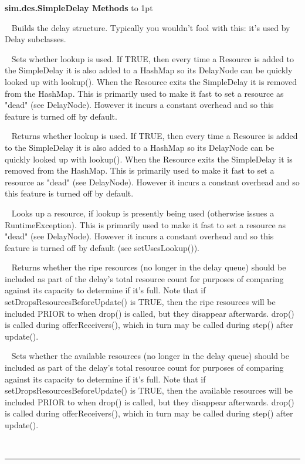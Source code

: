 \documentclass[twoside,10pt]{article}
\newcommand\class[1]{\index{Classes!{#1}}\textsf{#1}}
\newcommand*{\xfill}[1][0pt]{%
	\cleaders
		\hbox to 1pt{\hss
			\raisebox{#1}{\rule{1.2pt}{0.4pt}}%
			\hss}\hfill}
\newenvironment{methods}[1]{
\vspace{1.0em}\noindent\textsf{\textbf{#1 Methods}}\quad \xfill[0.5ex]
\vspace{-0.25em}
\begin{description}
\small}
{\end{description}\hrule\vspace{1.5em}}
\newcommand{\mthd}[1]{\item[{\sf #1}]~\newline}
\begin{document}
\begin{methods}{\class{sim.des.SimpleDelay}}
\mthd{protected void buildDelay()}
Builds the delay structure.   Typically you wouldn't fool with this: it's used by Delay subclasses.
\mthd{public void setUsesLookup(boolean val)}
Sets whether lookup is used.  If TRUE, then every time a Resource is added to the SimpleDelay it is also
    	added to a HashMap so its DelayNode can be quickly looked up with lookup().  When the Resource exits
    	the SimpleDelay it is removed from the HashMap.  This is primarily used to make it fast to
    	set a resource as "dead" (see DelayNode). However it incurs a constant overhead and so this feature
    	is turned off by default.
\mthd{public boolean getUsesLookup()}
Returns whether lookup is used.  If TRUE, then every time a Resource is added to the SimpleDelay it is also
    	added to a HashMap so its DelayNode can be quickly looked up with lookup().  When the Resource exits
    	the SimpleDelay it is removed from the HashMap.  This is primarily used to make it fast to
    	set a resource as "dead" (see DelayNode). However it incurs a constant overhead and so this feature
    	is turned off by default.
\mthd{public DelayNode lookup(Resource resource)}
 Looks up a resource, if lookup is presently being used (otherwise issues a RuntimeException).
    	This is primarily used to make it fast to
    	set a resource as "dead" (see DelayNode). However it incurs a constant overhead and so this feature
    	is turned off by default (see setUsesLookup()).         
\mthd{public boolean getIncludesAvailableResourcesInTotal()}
Returns whether the ripe resources (no longer in the delay queue) should be included as part of the delay's
    	total resource count for purposes of comparing against its capacity to determine if it's full. Note that
    	if setDropsResourcesBeforeUpdate() is TRUE, then the ripe resources will be included PRIOR to when drop()
    	is called, but they disappear afterwards.  drop() is called during offerReceivers(), which in turn may
    	be called during step() after update().
\mthd{public void setIncludesAvailableResourcesInTotal(boolean val)}
Sets whether the available resources (no longer in the delay queue) should be included as part of the delay's
    	total resource count for purposes of comparing against its capacity to determine if it's full. Note that
    	if setDropsResourcesBeforeUpdate() is TRUE, then the available resources will be included PRIOR to when drop()
    	is called, but they disappear afterwards.  drop() is called during offerReceivers(), which in turn may
    	be called during step() after update().
\mthd{public boolean accept(Provider provider, Resource amount, double atLeast, double atMost)}

\end{methods}
\end{document}
